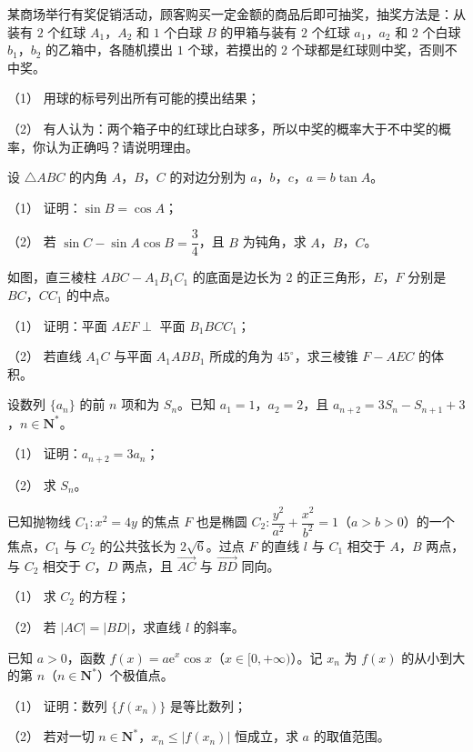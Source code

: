 \begin{question}
某商场举行有奖促销活动，顾客购买一定金额的商品后即可抽奖，抽奖方法是：从装有 \(2\) 个红球 \(A_1\)，\(A_2\) 和 \(1\) 个白球 \(B\) 的甲箱与装有 \(2\) 个红球 \(a_1\)，\(a_2\) 和 \(2\) 个白球 \(b_1\)，\(b_2\) 的乙箱中，各随机摸出 \(1\) 个球，若摸出的 \(2\) 个球都是红球则中奖，否则不中奖。

（1） 用球的标号列出所有可能的摸出结果；

（2） 有人认为：两个箱子中的红球比白球多，所以中奖的概率大于不中奖的概率，你认为正确吗？请说明理由。

\end{question}
\begin{question}
设 \(\triangle ABC\) 的内角 \(A\)，\(B\)，\(C\) 的对边分别为 \(a\)，\(b\)，\(c\)，\(a=b\tan A\)。

（1） 证明：\(\sin B=\cos A\)；

（2） 若 \(\sin C-\sin A\cos B=\dfrac34\)，且 \(B\) 为钝角，求 \(A\)，\(B\)，\(C\)。

\Needspace{0.4\textheight}
\end{question}
\begin{question}
如图，直三棱柱 \(ABC-A_1B_1C_1\) 的底面是边长为 \(2\) 的正三角形，\(E\)，\(F\) 分别是 \(BC\)，\(CC_1\) 的中点。

（1） 证明：平面 \(AEF\perp\) 平面 \(B_1BCC_1\)；

（2） 若直线 \(A_1C\) 与平面 \(A_1ABB_1\) 所成的角为 \(45^\circ\)，求三棱锥 \(F-AEC\) 的体积。
\nopagebreak[4]
\begin{center}\end{center}
\nopagebreak[4]
\end{question}
\begin{question}
设数列 \(\{a_n\}\) 的前 \(n\) 项和为 \(S_n\)。已知 \(a_1=1\)，\(a_2=2\)，且 \(a_{n+2}=3S_n-S_{n+1}+3\)，\(n\in\mathbf{N}^*\)。

（1） 证明：\(a_{n+2}=3a_n\)；

（2） 求 \(S_n\)。

\end{question}
\begin{question}
已知抛物线 \(C_1:x^2=4y\) 的焦点 \(F\) 也是椭圆 \(C_2:\dfrac{y^2}{a^2}+\dfrac{x^2}{b^2}=1\)（\(a>b>0\)）的一个焦点，\(C_1\) 与 \(C_2\) 的公共弦长为 \(2\sqrt6\)。过点 \(F\) 的直线 \(l\) 与 \(C_1\) 相交于 \(A\)，\(B\) 两点，与 \(C_2\) 相交于 \(C\)，\(D\) 两点，且 \(\overrightarrow{AC}\) 与 \(\overrightarrow{BD}\) 同向。

（1） 求 \(C_2\) 的方程；

（2） 若 \(|AC|=|BD|\)，求直线 \(l\) 的斜率。

\end{question}
\begin{question}
已知 \(a>0\)，函数 \(f(x)=a\mathrm{e}^x\cos x\)（\(x\in[0,+\infty)\)）。记 \(x_n\) 为 \(f(x)\) 的从小到大的第 \(n\)（\(n\in\mathbf{N}^*\)）个极值点。

（1） 证明：数列 \(\{f(x_n)\}\) 是等比数列；

（2） 若对一切 \(n\in\mathbf{N}^*\)，\(x_n\leqslant|f(x_n)|\) 恒成立，求 \(a\) 的取值范围。

\end{question}